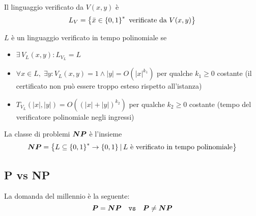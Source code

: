 \begin{definition}
    \label{def:linguaggioverificato}
    Il linguaggio verificato da $V(x,y)$ è
    \begin{equation*}
        L_V = \left\{ \bar{x} \in \left\{0,1\right\}^{*} \text{ verificate da } V(x,y) \right\}
    \end{equation*}
\end{definition}

\begin{definition}
    \label{def:verificapolinomiale}
    $L$ è un linguaggio verificato in tempo polinomiale se
    \begin{itemize}
        \item $ \exists \, V_L (x,y) : L_{V_{L}} = L$
        \item $ \forall x \in L, \; \exists y : V_L(x,y) = 1 \wedge |y| = O \left( |x|^{k_{1}} \right) $ per qualche $k_1 \geq 0$ costante (il certificato non può essere troppo esteso rispetto all'istanza)
        \item $ T_{V_{L}} (|x|, |y|) = O \left( \left( |x|+|y| \right)^{k_{2}} \right)$ per qualche $k_2 \geq 0$ costante (tempo del verificatore polinomiale negli ingressi)
    \end{itemize}
\end{definition}

\begin{definition}
    \label{def:classenp}
    La classe di problemi $\bm{NP}{}$ è l'insieme
    \begin{equation*}
        \bm{NP}{} = \left\{ L \subseteq \left\{0,1\right\}^{*} \to \left\{0,1\right\}^{} |\, L \text{ è verificato in tempo polinomiale}\right\}
    \end{equation*}
\end{definition}

\subsection{P vs NP}
\label{sss:pvsnp}

La domanda del millennio è la seguente:
\begin{equation*}
    \bm{P}{} = \bm{NP}{}
    \quad
    \texttt{vs}
    \quad
    \bm{P}{} \neq \bm{NP}{}
\end{equation*}

